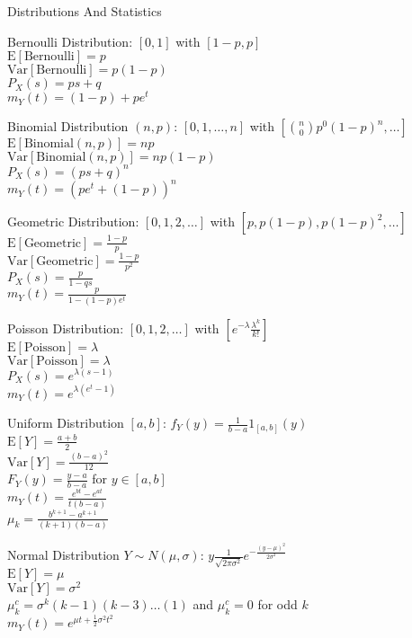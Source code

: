 Distributions And Statistics

Bernoulli Distribution: $[0,1]$ with $[1-p,p]$ \\
$\text{E}[\text{Bernoulli}]=p$ \\
$\text{Var}[\text{Bernoulli}]=p(1-p)$ \\
$P_X(s)=ps+q$ \\
$m_Y(t)=(1-p)+pe^t$

Binomial Distribution $(n,p)$: $[0,1,\dots,n]$ with $[\binom{n}{0}p^0(1-p)^n,\dots]$ \\
$\text{E}[\text{Binomial}(n,p)]=np$ \\
$\text{Var}[\text{Binomial}(n,p)]=np(1-p)$ \\
$P_X(s)=(ps+q)^n$ \\
$m_Y(t)=(pe^t+(1-p))^n$

Geometric Distribution: $[0,1,2,\dots]$ with $[p,p(1-p),p(1-p)^2,\dots]$ \\
$\text{E}[\text{Geometric}]=\frac{1-p}{p}$ \\
$\text{Var}[\text{Geometric}]=\frac{1-p}{p^2}$ \\
$P_X(s)=\frac{p}{1-qs}$ \\
$m_Y(t)=\frac{p}{1-(1-p)e^t}$

Poisson Distribution: $[0,1,2,\dots]$ with $[e^{-\lambda}\frac{\lambda^k}{k!}]$ \\
$\text{E}[\text{Poisson}]=\lambda$ \\
$\text{Var}[\text{Poisson}]=\lambda$ \\
$P_X(s)=e^{\lambda(s-1)}$ \\
$m_Y(t)=e^{\lambda (e^t-1)}$

Uniform Distribution $[a,b]$: $f_Y(y)=\frac{1}{b-a}1_{[a,b]}(y)$ \\
$\text{E}[Y]=\frac{a+b}{2}$ \\
$\text{Var}[Y]=\frac{(b-a)^2}{12}$ \\
$F_Y(y)=\frac{y-a}{b-a}$ for $y\in [a,b]$ \\
$m_Y(t)=\frac{e^{bt}-e^{at}}{t(b-a)}$ \\
$\mu_k=\frac{b^{k+1}-a^{k+1}}{(k+1)(b-a)}$

Normal Distribution $Y\sim N(\mu,\sigma)$: $y\frac{1}{\sqrt{2\pi\sigma^2}}e^{-\frac{(y-\mu)^2}{2\sigma^2}}$ \\
$\text{E}[Y]=\mu$ \\
$\text{Var}[Y]=\sigma^2$ \\
$\mu_k^c=\sigma^k(k-1)(k-3)\dots(1)$ and $\mu_k^c=0$ for odd $k$ \\
$m_Y(t)=e^{\mu t+ \frac{1}{2} \sigma^2 t^2}$ 

